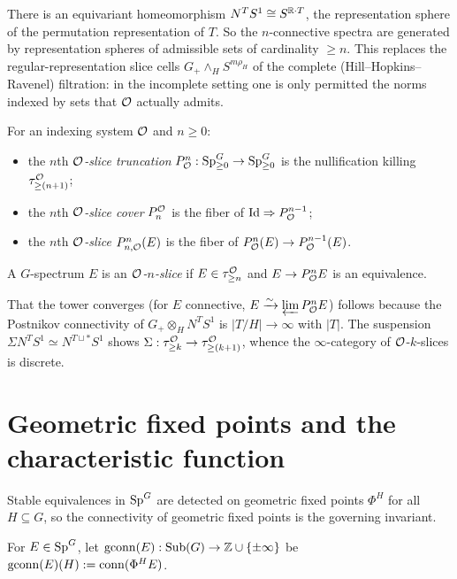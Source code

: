 \documentclass[11pt]{article}
\begin{document}
\begin{qfiveremark}
There is an equivariant homeomorphism $N^T S^1\cong S^{\mathbb{R}\cdot T}$, the
representation sphere of the permutation representation of $T$. So the
$n$-connective spectra are generated by representation spheres of admissible
sets of cardinality $\ge n$. This replaces the regular-representation slice cells
$G_+\wedge_H S^{m\rho_H}$ of the complete (Hill--Hopkins--Ravenel) filtration:
in the incomplete setting one is only permitted the norms indexed by sets that
$\mathcal{O}$ actually admits.
\end{qfiveremark}

\begin{qfivedefinition}
For an indexing system $\mathcal{O}$ and $n\ge 0$:
\begin{itemize}\setlength\itemsep{2pt}
\item the $n$th \emph{$\mathcal{O}$-slice truncation} $P^n_{\mathcal{O}}:\mathrm{Sp}^G_{\ge 0}\to
\mathrm{Sp}^G_{\ge 0}$ is the nullification killing $\tau^{\mathcal{O}}_{\ge(n+1)}$;
\item the $n$th \emph{$\mathcal{O}$-slice cover} $P^{\mathcal{O}}_n$ is the fiber of
$\mathrm{Id}\Rightarrow P^{n-1}_{\mathcal{O}}$;
\item the $n$th \emph{$\mathcal{O}$-slice} $P^n_{n,\mathcal{O}}(E)$ is the fiber of
$P^n_{\mathcal{O}}(E)\to P^{n-1}_{\mathcal{O}}(E)$.
\end{itemize}
A $G$-spectrum $E$ is an \emph{$\mathcal{O}$-$n$-slice} if $E\in\tau^{\mathcal{O}}_{\ge n}$ and
$E\to P^n_{\mathcal{O}} E$ is an equivalence.
\end{qfivedefinition}

That the tower converges (for $E$ connective, $E\xrightarrow{\sim}\varprojlim
P^n_{\mathcal{O}} E$) follows because the Postnikov connectivity of $G_+\otimes_H N^T S^1$
is $|T/H|\to\infty$ with $|T|$. The suspension $\Sigma N^T S^1\simeq N^{T\sqcup
\ast}S^1$ shows $\Sigma:\tau^{\mathcal{O}}_{\ge k}\to\tau^{\mathcal{O}}_{\ge(k+1)}$, whence the
$\infty$-category of $\mathcal{O}$-$k$-slices is discrete.

\section*{Geometric fixed points and the characteristic function}

Stable equivalences in $\mathrm{Sp}^G$ are detected on geometric fixed points
$\Phi^H$ for all $H\subseteq G$, so the connectivity of geometric fixed points
is the governing invariant.

\begin{qfivedefinition}
For $E\in\mathrm{Sp}^G$, let $\operatorname{gconn}(E):\operatorname{Sub}(G)\to\mathbb{Z}\cup\{\pm\infty\}$ be
$\operatorname{gconn}(E)(H):=\operatorname{conn}(\Phi^H E)$.
\end{qfivedefinition}
\end{document}
